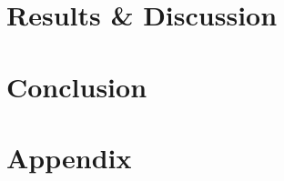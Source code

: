 \documentclass[12pt,a4paper]{article}
\begin{document}
\section{Results \& Discussion}


\section{Conclusion}




\printbibliography

\newpage
\section{Appendix}

\end{document}
